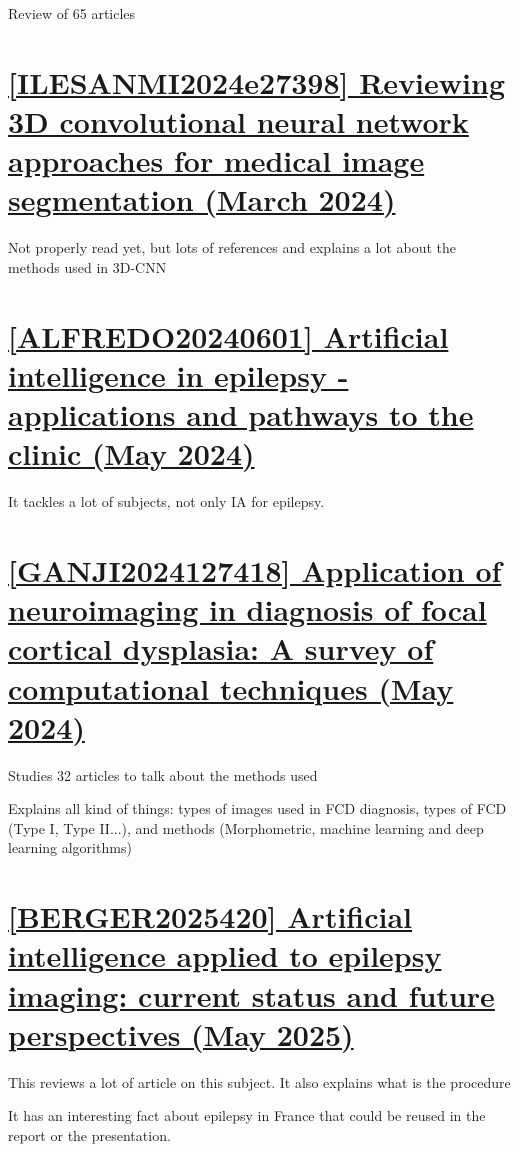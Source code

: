 Review of 65 articles

\section{\href{https://www.sciencedirect.com/science/article/pii/S2405844024034297}{[ILESANMI2024e27398] Reviewing 3D convolutional neural network approaches for medical image segmentation (March 2024)}}

Not properly read yet, but lots of references and explains a lot about the methods used in 3D-CNN

\section{\href{https://www.nature.com/articles/s41582-024-00965-9}{[ALFREDO20240601] Artificial intelligence in epilepsy - applications and pathways to the clinic (May 2024) }}

It tackles a lot of subjects, not only IA for epilepsy.

\section{\href{https://www.sciencedirect.com/science/article/pii/S0925231224001899}{[GANJI2024127418] Application of neuroimaging in diagnosis of focal cortical dysplasia: A survey of computational techniques (May 2024)}}

Studies 32 articles to talk about the methods used

Explains all kind of things: types of images used in FCD diagnosis, types of FCD (Type I, Type II...), and methods (Morphometric, machine learning and deep learning algorithms)

\section{\href{https://www.sciencedirect.com/science/article/pii/S0035378725004874}{[BERGER2025420] Artificial intelligence applied to epilepsy imaging: current status and future perspectives (May 2025) }}

This reviews a lot of article on this subject.
It also explains what is the procedure

It has an interesting fact about epilepsy in France that could be reused in the report or the presentation.

